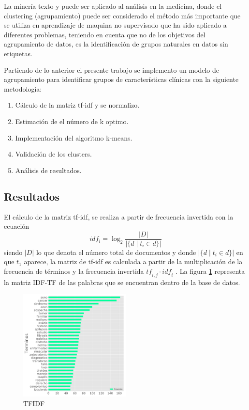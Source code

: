 La minería texto y puede ser aplicado al análisis en la medicina, donde el clustering (agrupamiento) puede ser considerado el método más importante que se utiliza en aprendizaje de maquina no supervisado que ha sido aplicado a diferentes problemas\cite{Kawashima2017}, teniendo en cuenta que no de los objetivos del agrupamiento de datos, es la  identificación de grupos naturales en datos sin etiquetas\cite{Jain2010}.

Partiendo de lo anterior el presente trabajo se implemento un modelo de agrupamiento para identificar grupos de características clínicas con la siguiente metodología:

\begin{enumerate}
	\item Cálculo de la matriz tf-idf y se normalizo. 
	\item Estimación de el número de k optimo.
	\item Implementación del algoritmo k-means.
	\item Validación de los clusters.
	\item Análisis de resultados. 	  
\end{enumerate}

\subsection{Resultados}

El cálculo de la matriz tf-idf, se realiza a partir de frecuencia invertida con la ecuación 
$${idf}_i = \log_2 \frac{|D|}{|\{d \mid t_i \in d\}|}$$
siendo $|D|$ lo que denota el número total de documentos y donde $|\{d\mid t_i \in d\}|$ en  que $t_1$ aparece, la matriz de tf-idf es calculada a partir de la multiplicación de la frecuencia de términos y la frecuencia invertida $\mathit{tf}_{i,j} \cdot \mathit{idf}_i$ \cite{Buckley1988}. 
La figura \ref{fig:IDFTF} representa la matriz IDF-TF de las palabras que se encuentran dentro de la base de datos.  

\begin{figure}[H] 
	\centering
	\includegraphics[width=0.5\textwidth]{Kap4/tfidf.pdf}
	\caption{TFIDF} 
	\label{fig:IDFTF}
\end{figure}

